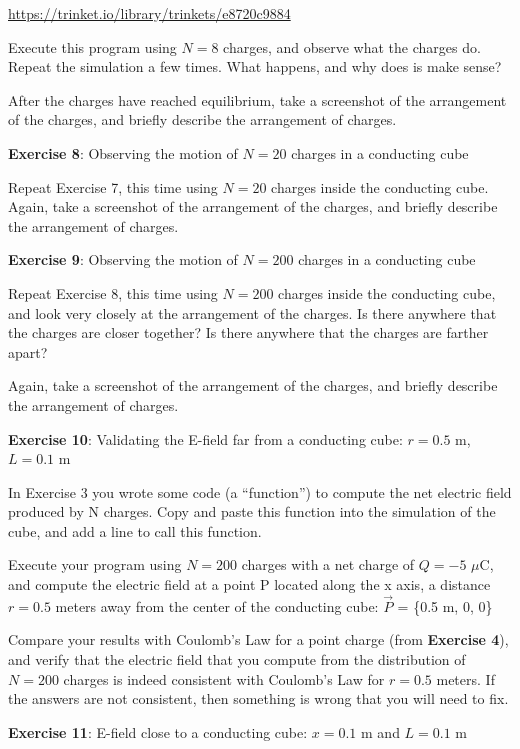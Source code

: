 \documentclass[]{article}
\begin{document}
\url{https://trinket.io/library/trinkets/e8720c9884}

Execute this program using \(N = 8\) charges, and observe what the
charges do. Repeat the simulation a few times. What happens, and why
does is make sense?

After the charges have reached equilibrium, take a screenshot of the
arrangement of the charges, and briefly describe the arrangement of
charges.

\textbf{Exercise 8}: Observing the motion of \(N = 20\) charges in a
conducting cube

Repeat Exercise 7, this time using \(N = 20\) charges inside the
conducting cube. Again, take a screenshot of the arrangement of the
charges, and briefly describe the arrangement of charges.

\textbf{Exercise 9}: Observing the motion of \(N = 200\) charges in a
conducting cube

Repeat Exercise 8, this time using \(N = 200\) charges inside the
conducting cube, and look very closely at the arrangement of the
charges. Is there anywhere that the charges are closer together? Is
there anywhere that the charges are farther apart?

Again, take a screenshot of the arrangement of the charges, and briefly
describe the arrangement of charges.

\textbf{Exercise 10}: Validating the E-field far from a conducting cube:
\(r = 0.5\) m, \(L = 0.1\) m

In Exercise 3 you wrote some code (a ``function'') to compute the net
electric field produced by N charges. Copy and paste this function into
the simulation of the cube, and add a line to call this function.

Execute your program using \(N = 200\) charges with a net charge of
\(Q = -5\) \(\mu\)C, and compute the electric field at a point P located
along the x axis, a distance \(r = 0.5\) meters away from the center of
the conducting cube: \(\vec{P}\) = \{0.5 m, 0, 0\}

Compare your results with Coulomb's Law for a point charge (from
\textbf{Exercise 4}), and verify that the electric field that you
compute from the distribution of \(N = 200\) charges is indeed
consistent with Coulomb's Law for \(r = 0.5\) meters. If the answers are
not consistent, then something is wrong that you will need to fix.

\textbf{Exercise 11}: E-field close to a conducting cube: \(x = 0.1\) m
and \(L = 0.1\) m
\end{document}
